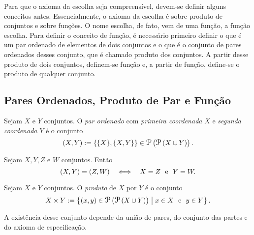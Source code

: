 Para que o axioma da escolha seja compreensível, devem-se definir alguns conceitos antes. Essencialmente, o axioma da escolha é sobre produto de conjuntos e sobre funções. O nome escolha, de fato, vem de uma função, a função escolha. Para definir o conceito de função, é necessário primeiro definir o que é um par ordenado de elementos de dois conjuntos e o que é o conjunto de pares ordenados desses conjunto, que é chamado produto dos conjuntos. A partir desse produto de dois conjuntos, definem-se função e, a partir de função, define-se o produto de qualquer conjunto.

\subsection*{Pares Ordenados, Produto de Par e Função}

\begin{defi}
Sejam $X$ e $Y$ conjuntos. O \emph{par ordenado} com \emph{primeira coordenada} $X$ e \emph{segunda coordenada} $Y$ é o conjunto
	\begin{equation*}
	(X,Y) := \{\{X\},\{X,Y\}\} \in \p\left(\p\left(X \cup Y\right)\right).
	\end{equation*}
\end{defi}

\begin{prop}
Sejam $X,Y,Z$ e $W$ conjuntos. Então
	\begin{equation*}
	(X,Y) = (Z,W) \quad \Longleftrightarrow \quad X=Z \text{\ \ e\ \ } Y=W.
	\end{equation*}
\end{prop}

\begin{defi}
Sejam $X$ e $Y$ conjuntos. O \emph{produto} de $X$ por $Y$ é o conjunto
	\begin{equation*}
	X \times Y := \set{(x,y) \in \p\left(\p\left(X \cup Y\right)\right)}{x \in X \e y \in Y}.
	\end{equation*}
\end{defi}

A existência desse conjunto depende da união de pares, do conjunto das partes e do axioma de especificação.

%

